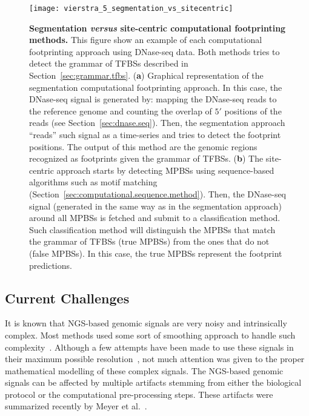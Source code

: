 \begin{figure}[h!]
\centering
\texttt{[image: vierstra\_5\_segmentation\_vs\_sitecentric]}
\caption[Segmentation \emph{versus} site-centric computational footprinting methods]{\textbf{Segmentation \emph{versus} site-centric computational footprinting methods.} This figure show an example of each computational footprinting approach using DNase-seq data. Both methods tries to detect the grammar of TFBSs described in Section~\ref{sec:grammar.tfbs}. (\textbf{a}) Graphical representation of the segmentation computational footprinting approach. In this case, the DNase-seq signal is generated by: mapping the DNase-seq reads to the reference genome and counting the overlap of $5\prime$ positions of the reads (see Section~\ref{sec:dnase.seq}). Then, the segmentation approach ``reads'' such signal as a time-series and tries to detect the footprint positions. The output of this method are the genomic regions recognized as footprints given the grammar of TFBSs. (\textbf{b}) The site-centric approach starts by detecting MPBSs using sequence-based algorithms such as motif matching (Section~\ref{sec:computational.sequence.method}). Then, the DNase-seq signal (generated in the same way as in the segmentation approach) around all MPBSs is fetched and submit to a classification method. Such classification method will distinguish the MPBSs that match the grammar of TFBSs (true MPBSs) from the ones that do not (false MPBSs). In this case, the true MPBSs represent the footprint predictions.}
\label{fig:gusmao_segmentation_vs_sitecentric}
\end{figure}

\subsection{Current Challenges}
\label{sec:current.challenges}

It is known that NGS-based genomic signals are very noisy and intrinsically complex. Most methods used some sort of smoothing approach to handle such complexity~\cite{pique2011,cuellar2012,sherwood2014,kahara2015}. Although a few attempts have been made to use these signals in their maximum possible resolution~\cite{boyle2011,sung2014}, not much attention was given to the proper mathematical modelling of these complex signals. The NGS-based genomic signals can be affected by multiple artifacts stemming from either the biological protocol or the computational pre-processing steps. These artifacts were summarized recently by Meyer et al.~\cite{meyer2014}.

